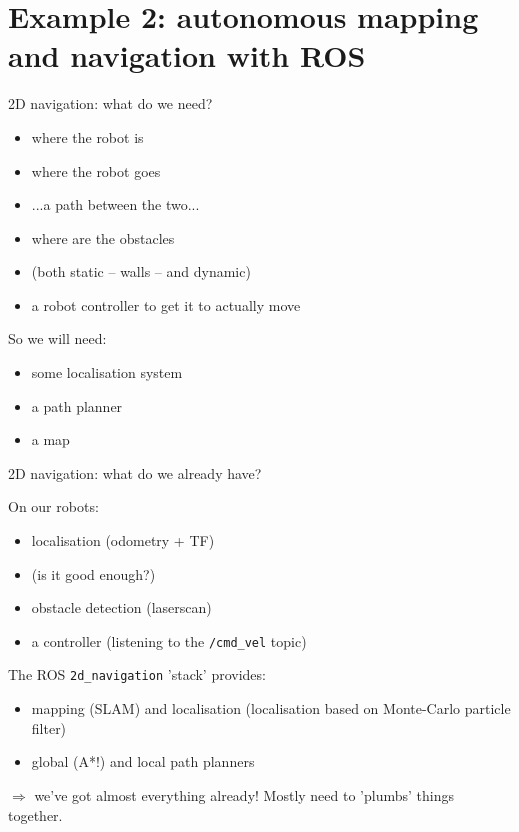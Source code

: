 \documentclass[compress]{beamer}
\begin{document}

\section[Navigation]{Example 2: autonomous mapping and navigation with ROS}

\begin{frame}{2D navigation: what do we need?}

    \begin{itemize}
        \item<+-> where the robot is
        \item<+-> where the robot goes
        \item<+-> ...a path between the two...
        \item<+-> where are the obstacles
        \item<+-> (both static -- walls -- and dynamic)
        \item<+-> a robot controller to get it to actually move
    \end{itemize}

    \pause

    So we will need:
    \begin{itemize}
        \item<+-> some localisation system
        \item<+-> a path planner
        \item<+-> a map
    \end{itemize}
\end{frame}


\begin{frame}{2D navigation: what do we already have?}

    On our robots:

    \begin{itemize}
        \item localisation (odometry + TF)
        \item<+-> (is it good enough?)
        \item<+-> obstacle detection (laserscan)
        \item<+-> a controller (listening to the \texttt{/cmd\_vel} topic)
    \end{itemize}

    \pause
    The ROS \texttt{2d\_navigation} 'stack' provides:

    \begin{itemize}
        \item mapping (SLAM) and localisation (localisation based on Monte-Carlo particle filter)
        \item global (A*!) and local path planners
    \end{itemize}

    \pause
    $\Rightarrow$ we've got almost everything already! Mostly need to 'plumbs'
    things together.
\end{frame}
\end{document}
